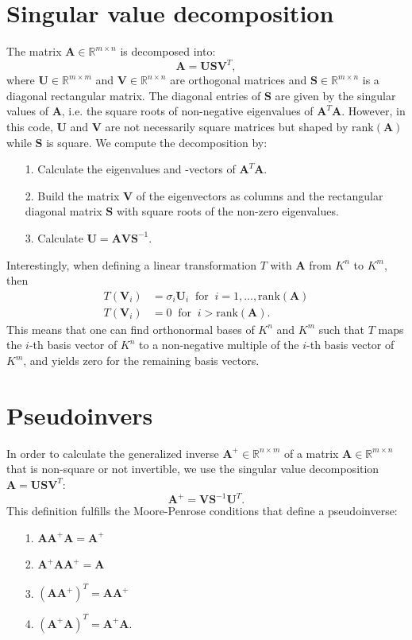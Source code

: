\documentclass[11pt, a4paper, parskip=half*, bibliography=totoc, cleardoublepage=empty, final,
numbers=noenddot]{scrbook}
\begin{document}
\section{Singular value decomposition}
The matrix $\bm{A} \in \mathbb{R}^{m \times n}$ is decomposed into:
\begin{equation}
\bm{A} = \bm{U} \bm{S} \bm{V}^T,
\end{equation}
where $\bm{U} \in \mathbb{R}^{m \times m}$ and $\bm{V} \in \mathbb{R}^{n \times n}$ are orthogonal matrices and  $\bm{S} \in \mathbb{R}^{m \times n}$ is a diagonal rectangular matrix. The diagonal entries of $\bm{S}$ are given by the singular values of $\bm{A}$, i.e. the square roots of non-negative eigenvalues of $\bm{A}^T \bm{A}$. However, in this code, $\bm{U}$ and $\bm{V}$ are not necessarily square matrices but shaped by $\text{rank}(\bm{A})$ while $\bm{S}$ is square. We compute the decomposition by:
\begin{itemize}
\item[1.] Calculate the eigenvalues and -vectors of $\bm{A}^T \bm{A}$.
\item[2.] Build the matrix $\bm{V}$ of the eigenvectors as columns and the rectangular diagonal matrix $\bm{S}$  with square roots of the non-zero eigenvalues.
\item[3.] Calculate $\bm{U} = \bm{A} \bm{V} \bm{S}^{-1}$.
\end{itemize}
Interestingly, when defining a linear transformation $T$ with $\bm{A}$ from $K^n$ to $K^m$, then 
\begin{align}
T(\bm{V}_i) &= \sigma_i \bm{U}_i \ \text{ for } \ i = 1,..., \text{rank}(\bm{A})\\
T(\bm{V}_i) &= 0 \ \text{ for } \ i > \text{rank}(\bm{A}).
\end{align}
This means that one can find orthonormal bases of $K^n$ and $K^m$ such that $T$ maps the $i$-th basis vector of $K^n$ to a non-negative multiple of the $i$-th basis vector of $K^m$, and yields zero for the remaining basis vectors. 

\section{Pseudoinvers}
In order to calculate the generalized inverse $\bm{A}^+ \in \mathbb{R}^{n \times m}$ of a matrix  $\bm{A} \in \mathbb{R}^{m \times n}$ that is non-square or not invertible, we use the singular value decomposition $\bm{A} = \bm{U} \bm{S} \bm{V}^T$:
\begin{equation}
\bm{A}^+ = \bm{V} \bm{S}^{-1} \bm{U}^T.
\end{equation}
This definition fulfills the Moore-Penrose conditions that define a pseudoinverse:
\begin{itemize}
\item[1.] $\bm{A} \bm{A}^+ \bm{A} = \bm{A}^+$
\item[2.] $\bm{A}^+ \bm{A} \bm{A}^+ = \bm{A}$
\item[3.] $(\bm{A} \bm{A}^+)^T = \bm{A} \bm{A}^+$
\item[4.] $(\bm{A}^+ \bm{A})^T = \bm{A}^+ \bm{A}$.
\end{itemize}
\end{document}
